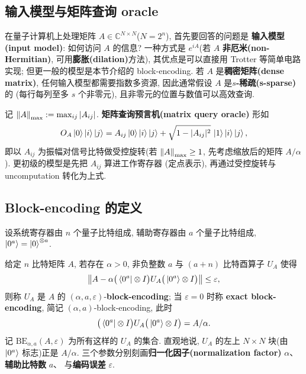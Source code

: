 \documentclass[utf8]{article} %
\numberwithin{equation}{section}   %
\newtheorem{Def}{\hskip 2em {\color{green} 定义}}[subsection]
\begin{document}
\subsection{输入模型与矩阵查询 oracle}

在量子计算机上处理矩阵 $A \in \mathbb{C}^{N \times N}$($N = 2^n$), 首先要回答的问题是
\textbf{输入模型(input model)}: 如何访问 $A$ 的信息? 一种方式是 $e^{iA}$(若 $A$ \textbf{非厄米(non-Hermitian)}, 可用\textbf{膨胀(dilation)}方法),
其优点是可以直接用 Trotter 等简单电路实现; 但更一般的模型是本节介绍的 block-encoding.
若 $A$ 是\textbf{稠密矩阵(dense matrix)}, 任何输入模型都需要指数多资源, 因此通常假设 $A$ 是\textbf{$s$-稀疏(s-sparse)}的
(每行每列至多 $s$ 个非零元), 且非零元的位置与数值可以高效查询.

\begin{Def}
    记 $\norm{A}_{\max} := \max_{ij}|A_{ij}|$. \textbf{矩阵查询预言机(matrix query oracle)} 形如
    \begin{equation}
        O_A \ket{0}\ket{i}\ket{j}
        = A_{ij}\ket{0}\ket{i}\ket{j} + \sqrt{1 - |A_{ij}|^2}\,\ket{1}\ket{i}\ket{j},
    \end{equation}
    即以 $A_{ij}$ 为振幅对信号比特做受控旋转(若 $\norm{A}_{\max} \ge 1$,
    先考虑缩放后的矩阵 $A/\alpha$). 更初级的模型是先把 $A_{ij}$ 算进工作寄存器
    (定点表示), 再通过受控旋转与 uncomputation 转化为上式.
\end{Def}

\subsection{Block-encoding 的定义}

设系统寄存器由 $n$ 个量子比特组成, 辅助寄存器由 $a$ 个量子比特组成,
$\ket{0^a} = \ket{0}^{\otimes a}$.

\begin{Def} \label{def:be}
    给定 $n$ 比特矩阵 $A$, 若存在 $\alpha > 0$, 非负整数 $a$ 与 $(a+n)$ 比特酉算子 $U_A$ 使得
    \begin{equation}
        \norm{A - \alpha \big(\bra{0^a}\otimes I\big) U_A \big(\ket{0^a}\otimes I\big)} \le \varepsilon,
    \end{equation}
    则称 $U_A$ 是 $A$ 的 $(\alpha, a, \varepsilon)$-\textbf{block-encoding};
    当 $\varepsilon = 0$ 时称 \textbf{exact block-encoding}, 简记 $(\alpha, a)$-block-encoding, 此时
    \begin{equation}
        \big(\bra{0^a}\otimes I\big) U_A \big(\ket{0^a}\otimes I\big) = A/\alpha.
    \end{equation}
    记 $\mathrm{BE}_{\alpha,a}(A, \varepsilon)$ 为所有这样的 $U_A$ 的集合.
    直观地说, $U_A$ 的左上 $N \times N$ 块(由 $\ket{0^a}$ 标志)正是 $A/\alpha$.
    三个参数分别刻画\textbf{归一化因子(normalization factor)} $\alpha$、\textbf{辅助比特数} $a$、
    与\textbf{编码误差} $\varepsilon$.
\end{Def}
\end{document}
